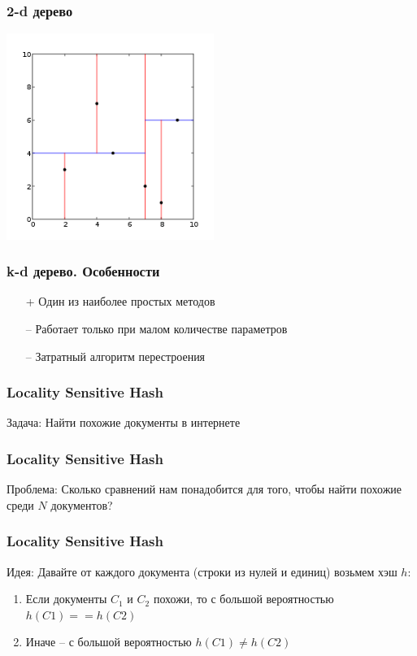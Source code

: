 \documentclass[10pt]{beamer}
\begin{document}
\begin{frame}\frametitle{2-d дерево}
	\begin{center}
    	\includegraphics[height=190pt]{images/Kdtree_2d}  	
	\end{center}
\end{frame}

\begin{frame}\frametitle{k-d дерево. Особенности}
	\begin{itemize} [<+- | alert@ +>]
	  \item[+] Один из наиболее простых методов
	  \bigbreak	
	  \item[--] Работает только при малом количестве параметров
	  \item[--] Затратный алгоритм перестроения
	\end{itemize}
\end{frame}

\begin{frame}\frametitle{Locality Sensitive Hash}
  \alert{Задача}: Найти похожие документы в интернете\\
\end{frame}

\begin{frame}\frametitle{Locality Sensitive Hash}
	\alert{Проблема}: Сколько сравнений нам понадобится  для того, чтобы найти похожие среди $N$ документов?\\
	\bigbreak
	\uncover<2>{
	$C = \frac{N(N-1)}{2}$\\
	\bigbreak
	$N = 10^6 \Rightarrow C = 5*10^{11}$
	}
\end{frame}

\begin{frame}\frametitle{Locality Sensitive Hash}
	\alert{Идея}: Давайте от каждого документа (строки из нулей и единиц) возьмем хэш $h$:\\
	\begin{enumerate} [<+->]
	\item Если документы $C_1$ и $C_2$ похожи, то с большой вероятностью $h(C1) == h(C2)$\\
	\item Иначе -- с большой вероятностью $h(C1) \neq h(C2)$
	\end{enumerate}
\end{frame}
\end{document}
